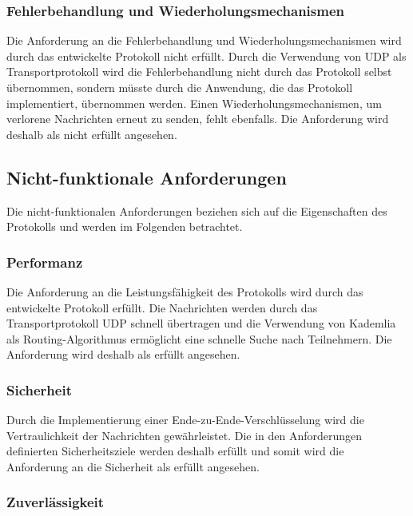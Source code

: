 \subsubsection{Fehlerbehandlung und Wiederholungsmechanismen}

Die Anforderung an die Fehlerbehandlung und Wiederholungsmechanismen wird durch das entwickelte Protokoll nicht erfüllt. Durch die Verwendung von UDP als Transportprotokoll wird die Fehlerbehandlung nicht durch das Protokoll selbst übernommen, sondern müsste durch die Anwendung, die das Protokoll implementiert, übernommen werden. Einen Wiederholungsmechanismen, um verlorene Nachrichten erneut zu senden, fehlt ebenfalls. Die Anforderung wird deshalb als nicht erfüllt angesehen.



\subsection{Nicht-funktionale Anforderungen}
\label{subsec:nicht_funktionale_anforderungen}

Die nicht-funktionalen Anforderungen beziehen sich auf die Eigenschaften des Protokolls und werden im Folgenden betrachtet.


\subsubsection{Performanz}

Die Anforderung an die Leistungsfähigkeit des Protokolls wird durch das entwickelte Protokoll erfüllt. Die Nachrichten werden durch das Transportprotokoll UDP schnell übertragen und die Verwendung von Kademlia als Routing-Algorithmus ermöglicht eine schnelle Suche nach Teilnehmern. Die Anforderung wird deshalb als erfüllt angesehen.


\subsubsection{Sicherheit}

Durch die Implementierung einer Ende-zu-Ende-Verschlüsselung wird die Vertraulichkeit der Nachrichten gewährleistet. Die in den Anforderungen definierten Sicherheitsziele werden deshalb erfüllt und somit wird die Anforderung an die Sicherheit als erfüllt angesehen.


\subsubsection{Zuverlässigkeit}

